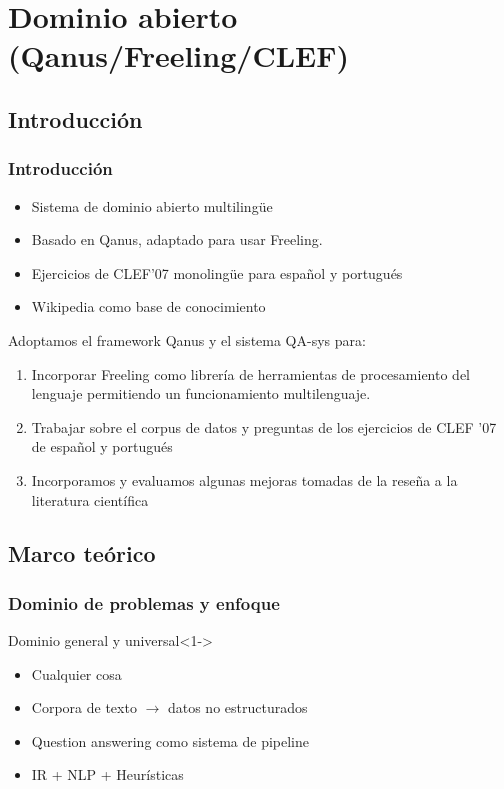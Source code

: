 \section{Dominio abierto (Qanus/Freeling/CLEF)}

\subsection{Introducción}

\begin{frame}
\frametitle{Introducción}
  \begin{itemize}
    \item Sistema de dominio abierto multilingüe
    \item Basado en Qanus, adaptado para usar Freeling.
    \item Ejercicios de CLEF'07 monolingüe para español y portugués
    \item Wikipedia como base de conocimiento
  \end{itemize}

  Adoptamos el framework Qanus y el sistema QA-sys para:
  \begin{enumerate}
    \item Incorporar Freeling como librería de herramientas de procesamiento del lenguaje permitiendo un funcionamiento multilenguaje. 
    \item Trabajar sobre el corpus de datos y preguntas de los ejercicios de CLEF '07 de español y portugués
    \item Incorporamos y evaluamos algunas mejoras tomadas de la reseña a la literatura científica
  \end{enumerate}

\end{frame}

\subsection{Marco teórico}

\begin{frame}
\frametitle{Dominio de problemas y enfoque}
     \begin{block}{Dominio general y universal}<1->
      \begin{itemize}
          \item Cualquier cosa
          \item Corpora de texto $\rightarrow$ datos no estructurados
          \item Question answering como sistema de pipeline
          \item IR + NLP + Heurísticas
      \end{itemize}
    \end{block}
\end{frame}

